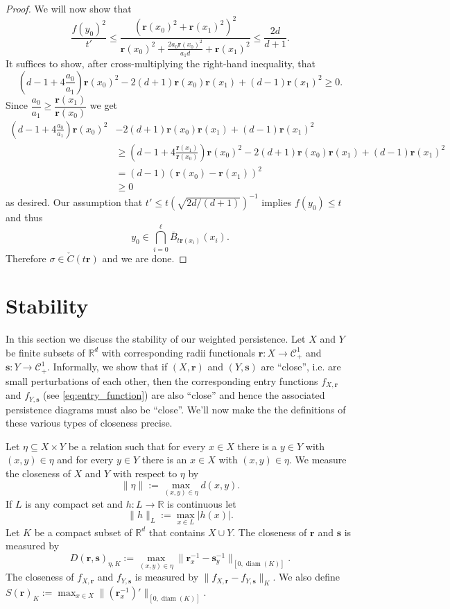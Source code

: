 \documentclass{amsart}
\newtheorem*{fibering lemma}{Fibering Lemma}
\newtheorem*{decomposition lemma}{Decomposition Lemma}
\newtheorem*{hurewicz theorem}{Hurewicz Theorem}
\theoremstyle{definition}
\newcommand{\Ball}{\bar{B}}
\DeclareMathOperator{\diam}{diam}
\begin{document}
\begin{proof}
We will now show that \[\frac{f(y_0)^2}{t'} \leq \frac{(\mathbf{r}(x_0)^2 + \mathbf{r}(x_1)^2)^2}{\mathbf{r}(x_0)^2 + \frac{2 a_0 \mathbf{r}(x_0)^2}{a_1 d} + \mathbf{r}(x_1)^2} \leq \frac{2d}{d+1}.\] It suffices to show, after cross-multiplying the right-hand inequality, that \[(d - 1 + 4\frac{a_0}{a_1}) \mathbf{r}(x_0)^2 - 2(d+1) \mathbf{r}(x_0) \mathbf{r}(x_1) + (d-1) \mathbf{r}(x_1)^2 \geq 0.\] Since $\dfrac{a_0}{a_1} \geq \dfrac{\mathbf{r}(x_1)}{\mathbf{r}(x_0)}$ we get
\begin{align*}
\left(d - 1 + 4\frac{a_0}{a_1}\right) \mathbf{r}(x_0)^2 &- 2(d+1) \mathbf{r}(x_0) \mathbf{r}(x_1) + (d-1) \mathbf{r}(x_1)^2 \\
			&\geq \left(d - 1 + 4\frac{\mathbf{r}(x_1)}{\mathbf{r}(x_0)}\right) \mathbf{r}(x_0)^2 - 2(d+1) \mathbf{r}(x_0) \mathbf{r}(x_1) + (d-1) \mathbf{r}(x_1)^2 \\
			&= (d-1)\left(\mathbf{r}(x_0) - \mathbf{r}(x_1)\right)^2 \\
			&\geq 0
\end{align*}
as desired. Our assumption that $t' \le t (\sqrt{2d/(d+1)})^{-1}$ implies $f(y_0) \leq t$ and thus \[y_0 \in \bigcap\limits_{i = 0}^{\ell} \Ball_{t \mathbf{r}(x_i)} (x_i).\] Therefore $\sigma \in \check{C}(t\mathbf{r})$ and we are done.
	\end{proof}

\section{Stability} %


In this section we discuss the stability of our weighted persistence.  Let $X$ and $Y$ be finite subsets of $\mathbb{R}^d$ with corresponding radii functionals ${\mathbf r}: X \to \mathcal{C}^1_+$ and $\mathbf{s}: Y \to \mathcal{C}^1_+$.  Informally, we show that if $(X, \mathbf{r})$ and $(Y, \mathbf{s})$ are ``close'', i.e. are small perturbations of each other, then the corresponding entry functions $f_{X, \mathbf{r}}$ and $f_{Y,\mathbf{s}}$ (see \eqref{eq:entry_function}) are also ``close'' and hence the associated persistence diagrams must also be ``close''.  We'll now make the the definitions of these various types of closeness precise.

Let $\eta \subseteq X \times Y$ be a relation such that for every $x \in X$ there is a $y \in Y$ with $(x,y) \in \eta$ and for every $y \in Y$ there is an $x \in X$ with $(x,y) \in \eta$.  We measure the closeness of $X$ and $Y$ with respect to $\eta$ by \[\|\eta\| := \max_{(x,y) \in \eta} d(x,y).\]  If $L$ is any compact set and $h : L \to \mathbb{R}$ is continuous let \[\|h\|_L := \max_{x \in L} |h(x)|.\] Let $K$ be a compact subset of $\mathbb{R}^d$ that contains $X \cup Y$.  The closeness of $\mathbf{r}$ and $\mathbf{s}$ is measured by \[D(\mathbf{r}, \mathbf{s})_{\eta,K} := \max_{(x,y) \in \eta} \|\mathbf{r}_x^{-1} - \mathbf{s}_y^{-1}\|_{[0,\diam(K)]}.\]  
The closeness of $f_{X, \mathbf{r}}$ and $f_{Y,\mathbf{s}}$ is measured by $\|f_{X, \mathbf{r}} - f_{Y,\mathbf{s}}\|_K.$  We also define $S(\mathbf{r})_K := \max_{x \in X} \|(\mathbf{r}^{-1}_x)'\|_{[0,\diam(K)]}$.
\end{document}
